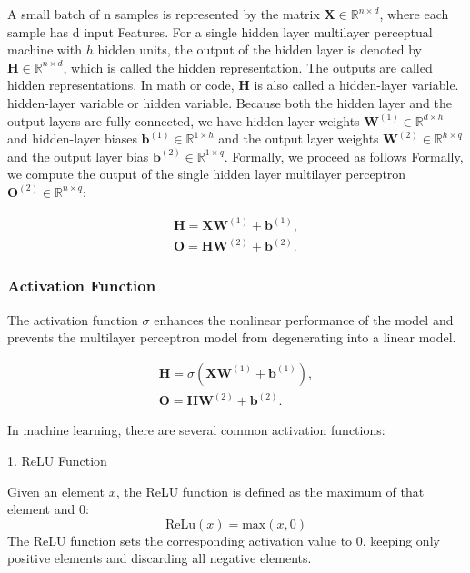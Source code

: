 \documentclass[a4paper,12pt]{article}
\begin{document}
A small batch of n samples is represented by the matrix $\mathbf{X} \in \mathbb{R}^{n \times d}$, where each sample has d input
Features. For a single hidden layer multilayer perceptual machine with $h$ hidden units, the output of the hidden layer is denoted by $\mathbf{H} \in \mathbb{R}^{n \times d}$, which is called the hidden representation.
The outputs are called hidden representations. In math or code, $\mathbf{H}$ is also called a hidden-layer variable.
hidden-layer variable or hidden variable. Because both the hidden layer and the output
layers are fully connected, we have hidden-layer weights $\mathbf{W}^{(1)} \in \mathbb{R}^{d \times h}$ and hidden-layer biases $\mathbf{b}^{(1)} \in \mathbb{R}^{1 \times h}$
and the output layer weights $\mathbf{W}^{(2)} \in \mathbb{R}^{h \times q}$ and the output layer bias $\mathbf{b}^{(2)} \in \mathbb{R}^{1 \times q}$. Formally, we proceed as follows
Formally, we compute the output of the single hidden layer multilayer perceptron $\mathbf{O}^{(2)} \in \mathbb{R}^{n \times q}$:

\begin{equation}
\begin{split}
\mathbf{H} = \mathbf{XW}^{(1)} + \mathbf{b}^{(1)},\\
\mathbf{O} = \mathbf{HW}^{(2)} + \mathbf{b}^{(2)}.
\end{split}
\end{equation}

\subsubsection{Activation Function}
The activation function $\sigma$ enhances the nonlinear performance of the model and prevents the multilayer perceptron model from degenerating into a linear model.

\begin{equation}
\begin{split}
\mathbf{H} = \sigma(\mathbf{XW}^{(1)} + \mathbf{b}^{(1)}), \\
\mathbf{O} = \mathbf{HW}^{(2)} + \mathbf{b}^{(2)}.
\end{split}
\end{equation}

In machine learning, there are several common activation functions:

1. ReLU Function

Given an element \( x \), the ReLU function is defined as the maximum of that element and 0:
\begin{equation}
\text{ReLu}(x) = \text{max}(x,0)
\end{equation}
The ReLU function sets the corresponding activation value to 0, keeping only positive elements and discarding all negative elements.
\end{document}
